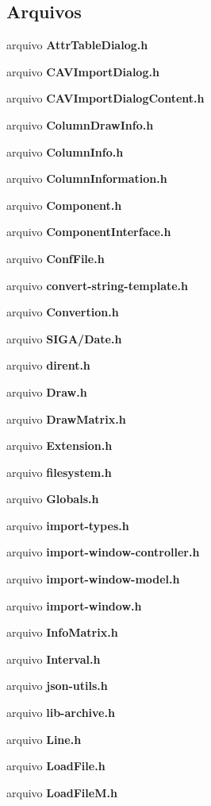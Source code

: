 \subsection*{Arquivos}
\begin{DoxyCompactItemize}
\item 
arquivo {\bf Attr\+Table\+Dialog.\+h}
\item 
arquivo {\bf C\+A\+V\+Import\+Dialog.\+h}
\item 
arquivo {\bf C\+A\+V\+Import\+Dialog\+Content.\+h}
\item 
arquivo {\bf Column\+Draw\+Info.\+h}
\item 
arquivo {\bf Column\+Info.\+h}
\item 
arquivo {\bf Column\+Information.\+h}
\item 
arquivo {\bf Component.\+h}
\item 
arquivo {\bf Component\+Interface.\+h}
\item 
arquivo {\bf Conf\+File.\+h}
\item 
arquivo {\bf convert-\/string-\/template.\+h}
\item 
arquivo {\bf Convertion.\+h}
\item 
arquivo {\bf S\+I\+G\+A/\+Date.\+h}
\item 
arquivo {\bf dirent.\+h}
\item 
arquivo {\bf Draw.\+h}
\item 
arquivo {\bf Draw\+Matrix.\+h}
\item 
arquivo {\bf Extension.\+h}
\item 
arquivo {\bf filesystem.\+h}
\item 
arquivo {\bf Globals.\+h}
\item 
arquivo {\bf import-\/types.\+h}
\item 
arquivo {\bf import-\/window-\/controller.\+h}
\item 
arquivo {\bf import-\/window-\/model.\+h}
\item 
arquivo {\bf import-\/window.\+h}
\item 
arquivo {\bf Info\+Matrix.\+h}
\item 
arquivo {\bf Interval.\+h}
\item 
arquivo {\bf json-\/utils.\+h}
\item 
arquivo {\bf lib-\/archive.\+h}
\item 
arquivo {\bf Line.\+h}
\item 
arquivo {\bf Load\+File.\+h}
\item 
arquivo {\bf Load\+File\+M.\+h}
\item 

\end{DoxyCompactItemize}
